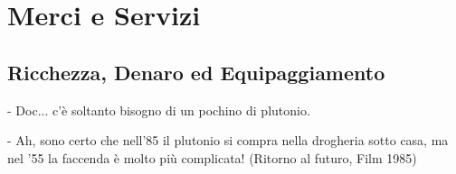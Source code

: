 \section{Merci e Servizi}


\subsection{Ricchezza, Denaro ed Equipaggiamento}


\begin{changemargin}{0.3cm}{0.3cm}\begin{enfasi}{
- Doc... c'è soltanto bisogno di un pochino di plutonio.

\medskip

- Ah, sono certo che nell'85 il plutonio si compra nella drogheria sotto casa, ma nel '55 la faccenda è molto più complicata! (Ritorno al futuro, Film 1985)}
\end{enfasi}\end{changemargin}\medskip

